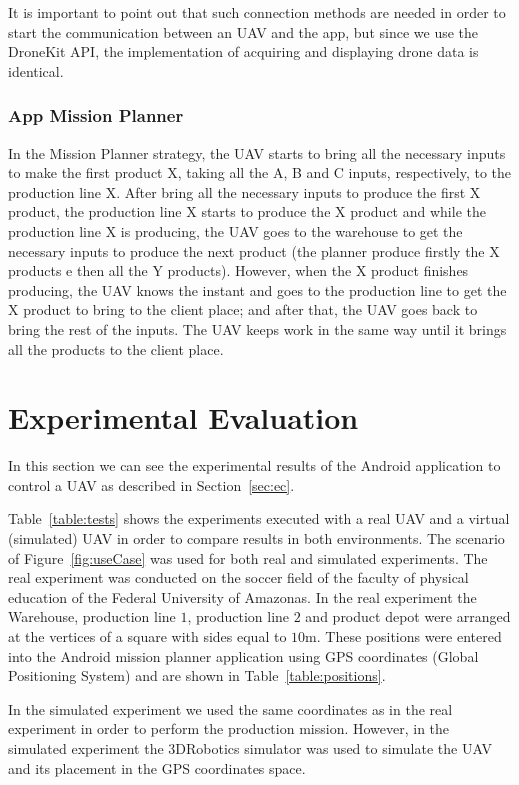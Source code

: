 \documentclass[12pt]{article}
\begin{document}
It is important to point out that such connection methods are needed in order to start the communication between an UAV and the app, but since we use the DroneKit API, the implementation of acquiring and displaying drone data is identical.

\subsubsection{App Mission Planner}
\label{subsubsec:mp}
In the Mission Planner strategy, the UAV starts to bring all the necessary inputs to make the first product X, taking all the A, B and C inputs, respectively, to the production line X. After bring all the necessary inputs to produce the first X product, the production line X starts to produce the X product and while the production line X is producing, the UAV goes to the warehouse to get the necessary inputs to produce the next product (the planner produce firstly the X products e then all the Y products). However, when the X product finishes producing, the UAV knows the instant and goes to the production line to get the X product to bring to the client place; and after that, the UAV goes back to bring the rest of the inputs. The UAV keeps work in the same way until it brings all the products to the client place.

\section{Experimental Evaluation}
\label{sec:results}

In this section we can see the experimental results of the Android application to control a UAV as described in Section~\ref{sec:ec}.

Table~\ref{table:tests} shows the experiments executed with a real UAV and a virtual (simulated) UAV in order to compare results in both environments.  The scenario of Figure~\ref{fig:useCase} was used for both real and simulated experiments. The real experiment was conducted on the soccer field of the faculty of physical education of the Federal University of Amazonas. In the real experiment the Warehouse, production line $1$, production line $2$ and product depot were arranged at the vertices of a square with sides equal to $10$m. These positions were entered into the Android mission planner application using GPS coordinates (Global Positioning System) and are shown in Table~\ref{table:positions}.

In the simulated experiment we used the same coordinates as in the real experiment in order to perform the production mission. However, in the simulated experiment the 3DRobotics simulator was used to simulate the UAV and its placement in the GPS coordinates space.
\end{document}
